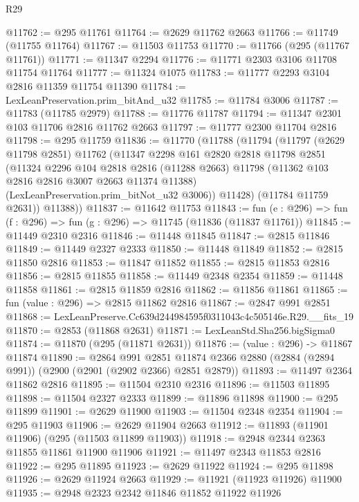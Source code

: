 \begin{lexlean}{R29}
\begin{coremodule}
@11762 := @295 @11761
@11764 := @2629 @11762 @2663
@11766 := @11749 (@11755 @11764)
@11767 := @11503 @11753
@11770 := @11766 (@295 (@11767 @11761))
@11771 := @11347 @2294
@11776 := @11771 @2303 @3106 @11708 @11754 @11764
@11777 := @11324 @1075
@11783 := @11777 @2293 @3104 @2816 @11359 @11754 @11390
@11784 := LexLeanPreservation.prim_bitAnd_u32
@11785 := @11784 @3006
@11787 := @11783 (@11785 @2979)
@11788 := @11776 @11787
@11794 := @11347 @2301 @103 @11706 @2816 @11762 @2663
@11797 := @11777 @2300 @11704 @2816
@11798 := @295 @11759
@11836 := @11770
    (@11788
      (@11794
        (@11797
          (@2629 @11798 @2851)
          @11762
          (@11347
            @2298
            @161
            @2820
            @2818
            @11798
            @2851
            (@11324
              @2296
              @104
              @2818
              @2816
              (@11288 @2663)
              @11798
              (@11362 @103 @2816 @2816 @3007 @2663 @11374 @11388)
              (LexLeanPreservation.prim_bitNot_u32 @3006))
            @11428)
          (@11784 @11759 @2631))
        @11388))
@11837 := @11642 @11753
@11843 := fun (e : @296) => fun (f : @296) => fun (g : @296) => @11745 (@11836 (@11837 @11761))
@11845 := @11449 @2310 @2316
@11846 := @11448 @11845
@11847 := @2815 @11846
@11849 := @11449 @2327 @2333
@11850 := @11448 @11849
@11852 := @2815 @11850 @2816
@11853 := @11847 @11852
@11855 := @2815 @11853 @2816
@11856 := @2815 @11855
@11858 := @11449 @2348 @2354
@11859 := @11448 @11858
@11861 := @2815 @11859 @2816
@11862 := @11856 @11861
@11865 := fun (value : @296) => @2815 @11862 @2816
@11867 := @2847 @991 @2851
@11868 := LexLeanPreserve.Cc639d244984595f0311043c4c505146e.R29.__fits_19
@11870 := @2853 (@11868 @2631)
@11871 := LexLeanStd.Sha256.bigSigma0
@11874 := @11870 (@295 (@11871 @2631))
@11876 := (value : @296) -> @11867 @11874
@11890 := @2864
    @991
    @2851
    @11874
    @2366
    @2880
    (@2884 (@2894 @991))
    (@2900 (@2901 (@2902 @2366) @2851 @2879))
@11893 := @11497 @2364 @11862 @2816
@11895 := @11504 @2310 @2316
@11896 := @11503 @11895
@11898 := @11504 @2327 @2333
@11899 := @11896 @11898
@11900 := @295 @11899
@11901 := @2629 @11900
@11903 := @11504 @2348 @2354
@11904 := @295 @11903
@11906 := @2629 @11904 @2663
@11912 := @11893 (@11901 @11906) (@295 (@11503 @11899 @11903))
@11918 := @2948 @2344 @2363 @11855 @11861 @11900 @11906
@11921 := @11497 @2343 @11853 @2816
@11922 := @295 @11895
@11923 := @2629 @11922
@11924 := @295 @11898
@11926 := @2629 @11924 @2663
@11929 := @11921 (@11923 @11926) @11900
@11935 := @2948 @2323 @2342 @11846 @11852 @11922 @11926

\end{coremodule}
\end{lexlean}
